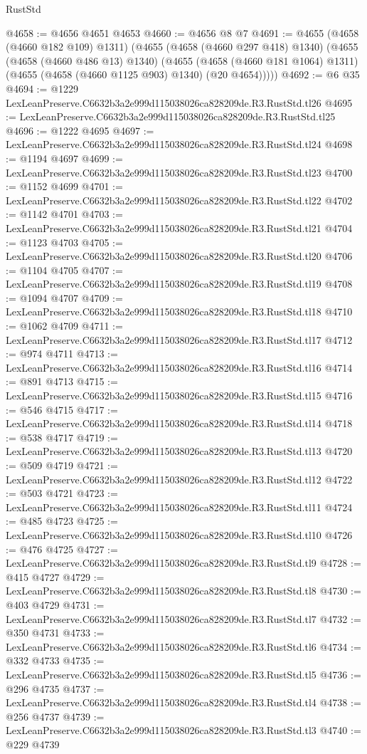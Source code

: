 \begin{lexlean}{RustStd}
\begin{coremodule}
@4658 := @4656 @4651 @4653
@4660 := @4656 @8 @7
@4691 := @4655
    (@4658 (@4660 @182 @109) @1311)
    (@4655
      (@4658 (@4660 @297 @418) @1340)
      (@4655
        (@4658 (@4660 @486 @13) @1340)
        (@4655
          (@4658 (@4660 @181 @1064) @1311)
          (@4655 (@4658 (@4660 @1125 @903) @1340) (@20 @4654)))))
@4692 := @6 @35
@4694 := @1229 LexLeanPreserve.C6632b3a2e999d115038026ca828209de.R3.RustStd.tl26
@4695 := LexLeanPreserve.C6632b3a2e999d115038026ca828209de.R3.RustStd.tl25
@4696 := @1222 @4695
@4697 := LexLeanPreserve.C6632b3a2e999d115038026ca828209de.R3.RustStd.tl24
@4698 := @1194 @4697
@4699 := LexLeanPreserve.C6632b3a2e999d115038026ca828209de.R3.RustStd.tl23
@4700 := @1152 @4699
@4701 := LexLeanPreserve.C6632b3a2e999d115038026ca828209de.R3.RustStd.tl22
@4702 := @1142 @4701
@4703 := LexLeanPreserve.C6632b3a2e999d115038026ca828209de.R3.RustStd.tl21
@4704 := @1123 @4703
@4705 := LexLeanPreserve.C6632b3a2e999d115038026ca828209de.R3.RustStd.tl20
@4706 := @1104 @4705
@4707 := LexLeanPreserve.C6632b3a2e999d115038026ca828209de.R3.RustStd.tl19
@4708 := @1094 @4707
@4709 := LexLeanPreserve.C6632b3a2e999d115038026ca828209de.R3.RustStd.tl18
@4710 := @1062 @4709
@4711 := LexLeanPreserve.C6632b3a2e999d115038026ca828209de.R3.RustStd.tl17
@4712 := @974 @4711
@4713 := LexLeanPreserve.C6632b3a2e999d115038026ca828209de.R3.RustStd.tl16
@4714 := @891 @4713
@4715 := LexLeanPreserve.C6632b3a2e999d115038026ca828209de.R3.RustStd.tl15
@4716 := @546 @4715
@4717 := LexLeanPreserve.C6632b3a2e999d115038026ca828209de.R3.RustStd.tl14
@4718 := @538 @4717
@4719 := LexLeanPreserve.C6632b3a2e999d115038026ca828209de.R3.RustStd.tl13
@4720 := @509 @4719
@4721 := LexLeanPreserve.C6632b3a2e999d115038026ca828209de.R3.RustStd.tl12
@4722 := @503 @4721
@4723 := LexLeanPreserve.C6632b3a2e999d115038026ca828209de.R3.RustStd.tl11
@4724 := @485 @4723
@4725 := LexLeanPreserve.C6632b3a2e999d115038026ca828209de.R3.RustStd.tl10
@4726 := @476 @4725
@4727 := LexLeanPreserve.C6632b3a2e999d115038026ca828209de.R3.RustStd.tl9
@4728 := @415 @4727
@4729 := LexLeanPreserve.C6632b3a2e999d115038026ca828209de.R3.RustStd.tl8
@4730 := @403 @4729
@4731 := LexLeanPreserve.C6632b3a2e999d115038026ca828209de.R3.RustStd.tl7
@4732 := @350 @4731
@4733 := LexLeanPreserve.C6632b3a2e999d115038026ca828209de.R3.RustStd.tl6
@4734 := @332 @4733
@4735 := LexLeanPreserve.C6632b3a2e999d115038026ca828209de.R3.RustStd.tl5
@4736 := @296 @4735
@4737 := LexLeanPreserve.C6632b3a2e999d115038026ca828209de.R3.RustStd.tl4
@4738 := @256 @4737
@4739 := LexLeanPreserve.C6632b3a2e999d115038026ca828209de.R3.RustStd.tl3
@4740 := @229 @4739

\end{coremodule}
\end{lexlean}
